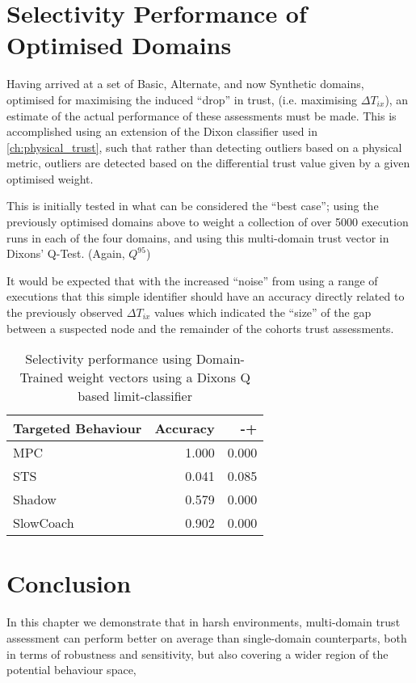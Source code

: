 \section{Selectivity Performance of Optimised Domains}

Having arrived at a set of Basic, Alternate, and now Synthetic domains, optimised for maximising the induced ``drop'' in trust, (i.e. maximising $\Delta T_{ix}$), an estimate of the actual performance of these assessments must be made.
This is accomplished using an extension of the Dixon classifier used in \autoref{ch:physical_trust}, such that rather than detecting outliers based on a physical metric, outliers are detected based on the differential trust value given by a given optimised weight.

This is initially tested in what can be considered the ``best case''; using the previously optimised domains above to weight a collection of over 5000 execution runs in each of the four domains, and using this multi-domain trust vector in Dixons' Q-Test. (Again, $Q^{95}$)

It would be expected that with the increased ``noise'' from using a range of executions that this simple identifier should have an accuracy directly related to the previously observed $\Delta T_{ix}$ values which indicated the ``size'' of the gap between a suspected node and the remainder of the cohorts trust assessments.
\begin{table}
	\begin{tabular}{|l|r|r|}
		\toprule
		Targeted Behaviour &        Accuracy &        -+ \\
		\midrule
       MPC & 1.000 & 0.000 \\
       STS & 0.041 & 0.085 \\
       Shadow & 0.579 & 0.000 \\
       SlowCoach & 0.902 & 0.000 \\
		\bottomrule
	\end{tabular}
	\caption{Selectivity performance using Domain-Trained weight vectors using a Dixons Q based limit-classifier}
\end{table}
\section{Conclusion}
In this chapter we demonstrate that in harsh environments, multi-domain trust assessment can perform better on average than single-domain counterparts, both in terms of robustness and sensitivity, but also covering a wider region of the potential behaviour space, 

